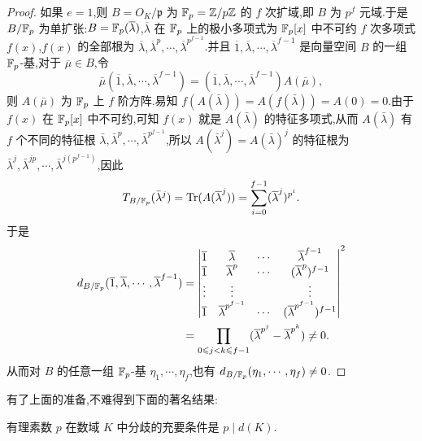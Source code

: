 \begin{proof}
如果 $e=1$,则 $B=O_K/\mathfrak{p}$ 为 $\mathbb{F}_p=\mathbb{Z}/p\mathbb{Z}$ 的 $f$ 次扩域,即 $B$ 为 $p^f$ 元域.于是 $B/\mathbb{F}_p$ 为单扩张:$B=\mathbb{F}_p(\overline{\lambda})$,$\overline{\lambda}$ 在 $\mathbb{F}_p$ 上的极小多项式为 $\mathbb{F}_p[x]$ 中不可约 $f$ 次多项式 $f(x)$,$f(x)$ 的全部根为 $\overline{\lambda},\overline{\lambda}^p,\cdots,\overline{\lambda}^{p^{f-1}}$.并且 $\overline{1},\overline{\lambda},\cdots,\overline{\lambda}^{f-1}$ 是向量空间 $B$ 的一组 $\mathbb{F}_p$-基,对于 $\overline{\mu}\in B$,令
\[
  \bar{\mu}(\overline{1},\overline{\lambda},\cdots,\overline{\lambda}^{f-1})
  =(\overline{1},\overline{\lambda},\cdots,\overline{\lambda}^{f-1})A(\bar{\mu}),
\]
则 $A(\bar{\mu})$ 为 $\mathbb{F}_p$ 上 $f$ 阶方阵.易知 $f(A(\bar{\lambda}))=A(f(\bar{\lambda}))=A(0)=0$.由于 $f(x)$ 在 $\mathbb{F}_p[x]$ 中不可约,可知 $f(x)$ 就是 $A(\bar{\lambda})$ 的特征多项式,从而 $A(\bar{\lambda})$ 有 $f$ 个不同的特征根 $\bar{\lambda},\bar{\lambda}^p,\cdots,\bar{\lambda}^{p^{f-1}}$,所以 $A(\bar{\lambda}^j)=A(\bar{\lambda})^j$ 的特征根为 $\bar{\lambda}^j,\bar{\lambda}^{jp},\cdots,\bar{\lambda}^{j(p^{f-1})}$,因此
\[
  T_{B/\mathbb{F}_p}(\bar{\lambda}^j)=\mathrm{Tr}(A(\overline{\lambda}^j))=\sum_{i=0}^{f-1}(\overline{\lambda}^j)^{p^i}.
\]
于是
\begin{align*}
  d_{B/\mathbb{F}_p}(\overline{1},\overline{\lambda},\cdots,\overline{\lambda}^{f-1})
  &=\begin{vmatrix}
    \overline{1} & \overline{\lambda} & \cdots & \overline{\lambda}^{f-1}\\
    \overline{1} & \overline{\lambda}^p & \cdots & (\overline{\lambda}^p)^{f-1}\\
    \vdots & \vdots & & \vdots\\
    \overline{1} & \overline{\lambda}^{p^{f-1}} & \cdots & (\overline{\lambda}^{p^{f-1}})^{f-1}
  \end{vmatrix}^2\\
  &=\prod_{0\leqslant j<k\leqslant f-1}(\overline{\lambda}^{p^j}-\overline{\lambda}^{p^k})\neq 0.
\end{align*}
从而对 $B$ 的任意一组 $\mathbb{F}_p$-基 $\eta_1,\cdots,\eta_f$,也有 $d_{B/\mathbb{F}_p}(\eta_1,\cdots,\eta_f)\neq 0$.
\end{proof}

有了上面的准备,不难得到下面的著名结果:

\begin{theorem}\label{thm:2.10}
有理素数 $p$ 在数域 $K$ 中分歧的充要条件是 $p\mid d(K)$.
\end{theorem}

